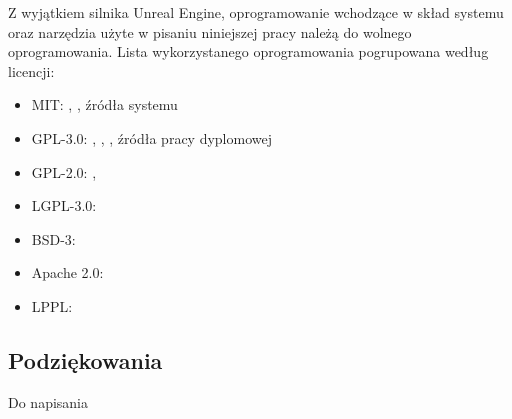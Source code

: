 Z wyjątkiem silnika Unreal Engine, oprogramowanie wchodzące w skład systemu oraz narzędzia użyte w pisaniu niniejszej pracy należą do wolnego oprogramowania. Lista wykorzystanego oprogramowania pogrupowana według licencji:
\begin{itemize}
    \item MIT: \cite{soft:vuepress}, \cite{soft:vscode}, źródła systemu
    \item GPL-3.0: \cite{soft:sitl}, \cite{soft:blender}, \cite{soft:wutthesis}, źródła pracy dyplomowej
    \item GPL-2.0: \cite{soft:git}, \cite{soft:tortoisesvn}
    \item LGPL-3.0: \cite{soft:mavlink}
    \item BSD-3: \cite{soft:pandas}
    \item Apache 2.0: \cite{soft:svn}
    \item LPPL: \cite{soft:latex}
\end{itemize}

\subsection{Podziękowania}
\begin{todo}
    Do napisania
\end{todo}